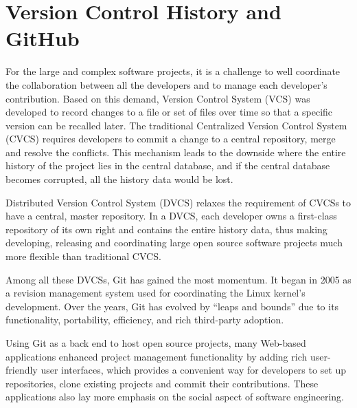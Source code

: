 
\label{chapter:relatedworks}

\newlength{\savedunitlength}
\setlength{\unitlength}{2em}

\section{Version Control History and GitHub}

For the large and complex software projects, it is a challenge to well coordinate the collaboration between all the developers and to manage each developer's contribution. Based on this demand, Version Control System (VCS) was developed to record changes to a file or set of files over time so that a specific version can be recalled later. \cite{chacon2009pro} The traditional Centralized Version Control System (CVCS) requires developers to commit a change to a central repository, merge and resolve the conflicts. This mechanism leads to the downside where the entire history of the project lies in the central database, and if the central database becomes corrupted, all the history data would be lost. \cite{chacon2009pro}\cite{5071408} 

Distributed Version Control System (DVCS) relaxes the requirement of CVCSs to have a central, master repository. In a DVCS, each developer owns a first-class repository of its own right and contains the entire history data,\cite{5071408} thus making developing, releasing and coordinating large open source software projects much more flexible than traditional CVCS. \cite{6607694}

Among all these DVCSs, Git has gained the most momentum. It began in 2005 as a revision management system used for coordinating the Linux kernel's development. Over the years, Git has evolved by ``leaps and bounds'' due to its functionality, portability, efficiency, and rich third-party adoption.\cite{6188603}

Using Git as a back end to host open source projects, many Web-based applications enhanced project management functionality by adding rich user-friendly user interfaces, which provides a convenient way for developers to set up repositories, clone existing projects and commit their contributions.\cite{6188603} These applications also lay more emphasis on the social aspect of software engineering. 

